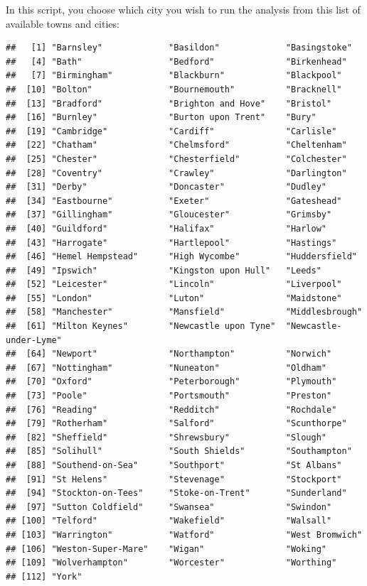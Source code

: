 \documentclass[
]{article}
\begin{document}
In this script, you choose which city you wish to run the analysis from
this list of available towns and cities:

\begin{verbatim}
##   [1] "Barnsley"             "Basildon"             "Basingstoke"
##   [4] "Bath"                 "Bedford"              "Birkenhead"
##   [7] "Birmingham"           "Blackburn"            "Blackpool"
##  [10] "Bolton"               "Bournemouth"          "Bracknell"
##  [13] "Bradford"             "Brighton and Hove"    "Bristol"
##  [16] "Burnley"              "Burton upon Trent"    "Bury"
##  [19] "Cambridge"            "Cardiff"              "Carlisle"
##  [22] "Chatham"              "Chelmsford"           "Cheltenham"
##  [25] "Chester"              "Chesterfield"         "Colchester"
##  [28] "Coventry"             "Crawley"              "Darlington"
##  [31] "Derby"                "Doncaster"            "Dudley"
##  [34] "Eastbourne"           "Exeter"               "Gateshead"
##  [37] "Gillingham"           "Gloucester"           "Grimsby"
##  [40] "Guildford"            "Halifax"              "Harlow"
##  [43] "Harrogate"            "Hartlepool"           "Hastings"
##  [46] "Hemel Hempstead"      "High Wycombe"         "Huddersfield"
##  [49] "Ipswich"              "Kingston upon Hull"   "Leeds"
##  [52] "Leicester"            "Lincoln"              "Liverpool"
##  [55] "London"               "Luton"                "Maidstone"
##  [58] "Manchester"           "Mansfield"            "Middlesbrough"
##  [61] "Milton Keynes"        "Newcastle upon Tyne"  "Newcastle-under-Lyme"
##  [64] "Newport"              "Northampton"          "Norwich"
##  [67] "Nottingham"           "Nuneaton"             "Oldham"
##  [70] "Oxford"               "Peterborough"         "Plymouth"
##  [73] "Poole"                "Portsmouth"           "Preston"
##  [76] "Reading"              "Redditch"             "Rochdale"
##  [79] "Rotherham"            "Salford"              "Scunthorpe"
##  [82] "Sheffield"            "Shrewsbury"           "Slough"
##  [85] "Solihull"             "South Shields"        "Southampton"
##  [88] "Southend-on-Sea"      "Southport"            "St Albans"
##  [91] "St Helens"            "Stevenage"            "Stockport"
##  [94] "Stockton-on-Tees"     "Stoke-on-Trent"       "Sunderland"
##  [97] "Sutton Coldfield"     "Swansea"              "Swindon"
## [100] "Telford"              "Wakefield"            "Walsall"
## [103] "Warrington"           "Watford"              "West Bromwich"
## [106] "Weston-Super-Mare"    "Wigan"                "Woking"
## [109] "Wolverhampton"        "Worcester"            "Worthing"
## [112] "York"
\end{verbatim}
\end{document}

